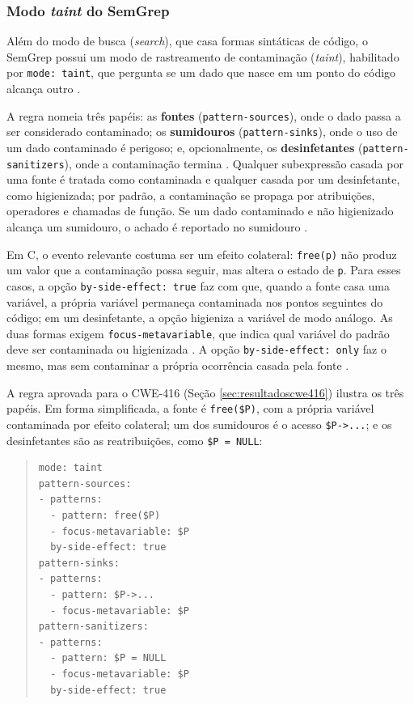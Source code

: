 \documentclass[
    12pt,                %
    openright,           %
    oneside,             %
    a4paper,             %
    english,             %
    brazil               %
]{abntex2}
\newcommand{\novo}[1]{{\color{red}#1}}
\begin{document}
\subsubsection{Modo \textit{taint} do SemGrep}
\label{sec:modotaint}
\par
Além do modo de busca (\textit{search}), que casa formas sintáticas de código, o SemGrep possui um modo de rastreamento de contaminação (\textit{taint}), habilitado por \texttt{mode: taint}, que pergunta se um dado que nasce em um ponto do código alcança outro \cite{semgrep2026taint}.
\par
A regra nomeia três papéis: as \textbf{fontes} (\texttt{pattern-sources}), onde o dado passa a ser considerado contaminado; os \textbf{sumidouros} (\texttt{pattern-sinks}), onde o uso de um dado contaminado é perigoso; e, opcionalmente, os \textbf{desinfetantes} (\texttt{pattern-sanitizers}), onde a contaminação termina \cite{semgrep2026taint}. 
Qualquer subexpressão casada por uma fonte é tratada como contaminada e qualquer casada por um desinfetante, como higienizada; por padrão, a contaminação se propaga por atribuições, operadores e chamadas de função. 
Se um dado contaminado e não higienizado alcança um sumidouro, o achado é reportado no sumidouro \cite{semgrep2026taint}.
\par
\novo{Em C, o evento relevante costuma ser um efeito colateral: \texttt{free(p)} não produz um valor que a contaminação possa seguir, mas altera o estado de \texttt{p}. Para esses casos, a opção \texttt{by-side-effect: true} faz com que, quando a fonte casa uma variável, a própria variável permaneça contaminada nos pontos seguintes do código; em um desinfetante, a opção higieniza a variável de modo análogo. As duas formas exigem \texttt{focus-metavariable}, que indica qual variável do padrão deve ser contaminada ou higienizada \cite{semgrep2026taintavancado}. A opção \texttt{by-side-effect: only} faz o mesmo, mas sem contaminar a própria ocorrência casada pela fonte \cite{semgrep2026taintavancado}.}
\par
\novo{A regra aprovada para o CWE-416 (Seção \ref{sec:resultadoscwe416}) ilustra os três papéis. Em forma simplificada, a fonte é \texttt{free(\$P)}, com a própria variável contaminada por efeito colateral; um dos sumidouros é o acesso \texttt{\$P->...}; e os desinfetantes são as reatribuições, como \texttt{\$P = NULL}:}
\begin{quote}
{\color{red}\footnotesize
\begin{verbatim}
mode: taint
pattern-sources:
- patterns:
  - pattern: free($P)
  - focus-metavariable: $P
  by-side-effect: true
pattern-sinks:
- patterns:
  - pattern: $P->...
  - focus-metavariable: $P
pattern-sanitizers:
- patterns:
  - pattern: $P = NULL
  - focus-metavariable: $P
  by-side-effect: true
\end{verbatim}
}
\end{quote}
\end{document}
